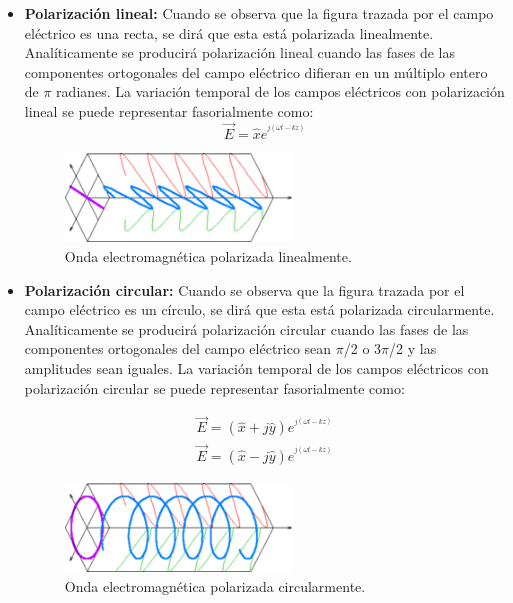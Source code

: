 \begin{itemize}
\item\textbf{Polarización lineal: }Cuando se observa que la figura trazada por el campo eléctrico es una recta, se dirá que esta está polarizada linealmente. Analíticamente se producirá polarización lineal cuando las fases de las componentes ortogonales del campo eléctrico difieran en un múltiplo entero de $\pi$ radianes. La variación temporal de los campos eléctricos con polarización lineal se puede representar fasorialmente como:
\begin{equation}
	\vec{E} = \hat{x}e^{^{j(\omega t-kz)}}
	\label{eq:pollineal}
\end{equation}
\begin{figure}[H]
    \centering
        \includegraphics[width=6cm]{archivos/polarizacion/lineal}
        \caption{Onda electromagnética polarizada linealmente.}
        \label{fig:pollin}
\end{figure}
\item\textbf{Polarización circular: }Cuando se observa que la figura trazada por el campo eléctrico es un círculo, se dirá que esta está polarizada circularmente. Analíticamente se producirá polarización circular cuando las fases de las componentes ortogonales del campo eléctrico sean $\pi$/2 o 3$\pi$/2 y las amplitudes sean iguales. La variación temporal de los campos eléctricos con polarización circular se puede representar fasorialmente como:

\begin{subequations}
	\begin{eqnarray}
		\vec{E} = (\hat{x}+j\hat{y})e^{^{j(\omega t-kz)}} \label{ecu:polcirlev} \\ %
		\vec{E} = (\hat{x}-j\hat{y})e^{^{j(\omega t-kz)}} \label{ecu:polcirdex} 
	\end{eqnarray}
\end{subequations}

\begin{figure}[H]
    \centering
        \includegraphics[width=6cm]{archivos/polarizacion/circular}
        \caption{Onda electromagnética polarizada circularmente.}
        \label{fig:polcir}
\end{figure}


\end{itemize}

